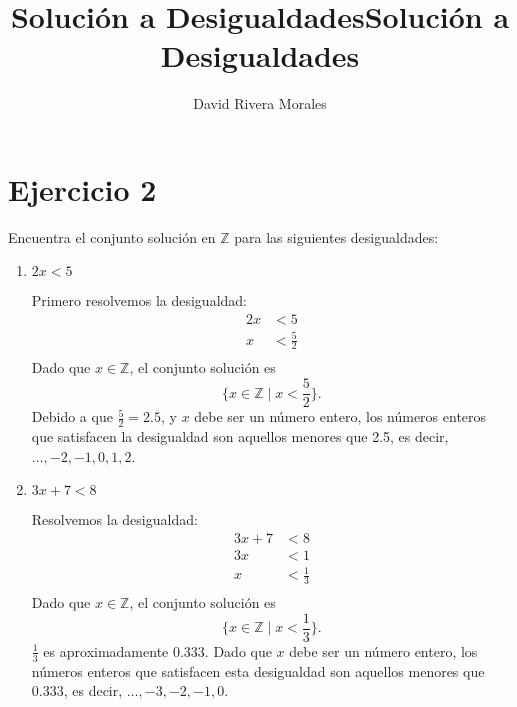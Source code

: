 \documentclass{article}
\begin{document}
\title{Solución a Desigualdades}
\title{Solución a Desigualdades}
\author{David Rivera Morales}
\maketitle

\section*{Ejercicio 2}

Encuentra el conjunto solución en \( \mathbb{Z} \) para las siguientes desigualdades:

\begin{enumerate}
    \item \( 2x < 5 \)
    
    Primero resolvemos la desigualdad:
    \begin{align*}
        2x &< 5 \\
        x &< \frac{5}{2} \\
    \end{align*}
    Dado que \( x \in \mathbb{Z} \), el conjunto solución es 
    \[
    \{ x \in \mathbb{Z} \mid x < \frac{5}{2} \}.
    \]
    Debido a que \( \frac{5}{2} = 2.5 \), y \( x \) debe ser un número entero, los números enteros que satisfacen la desigualdad son aquellos menores que 2.5, es decir, \( \dots, -2, -1, 0, 1, 2 \).
    
    \item \( 3x + 7 < 8 \)
    
    Resolvemos la desigualdad:
    \begin{align*}
        3x + 7 &< 8 \\
        3x &< 1 \\
        x &< \frac{1}{3} \\
    \end{align*}
    Dado que \( x \in \mathbb{Z} \), el conjunto solución es 
    \[
    \{ x \in \mathbb{Z} \mid x < \frac{1}{3} \}.
    \]
    \( \frac{1}{3} \) es aproximadamente 0.333. Dado que \( x \) debe ser un número entero, los números enteros que satisfacen esta desigualdad son aquellos menores que 0.333, es decir, \( \dots, -3, -2, -1, 0 \).
\end{enumerate}
\end{document}
